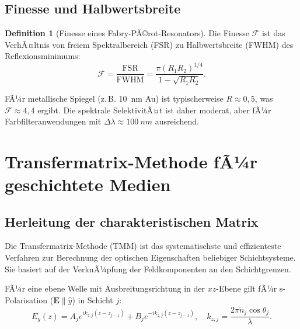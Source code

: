 ﻿\documentclass[a4paper,12pt]{article}
\theoremstyle{definition}
\newtheorem{definition}{Definition}[section]
\newcommand{\vect}[1]{\bm{#1}}
\begin{document}
	\subsection{Finesse und Halbwertsbreite}
	
	\begin{definition}[Finesse eines Fabry-PÃ©rot-Resonators]
		\label{def:finesse}
		Die Finesse $\mathcal{F}$ ist das VerhÃ¤ltnis von freiem Spektralbereich (FSR)
		zu Halbwertsbreite (FWHM) des Reflexionsminimums:
		\begin{equation}
			\mathcal{F} = \frac{\mathrm{FSR}}{\mathrm{FWHM}} = \frac{\pi (R_1 R_2)^{1/4}}{1 - \sqrt{R_1 R_2}}.
			\label{eq:finesse}
		\end{equation}
	\end{definition}
	
	FÃ¼r metallische Spiegel (z.\,B. \SI{10}{nm} Au) ist typischerweise
	$R \approx 0{,}5$, was $\mathcal{F} \approx 4{,}4$ ergibt.
	Die spektrale SelektivitÃ¤t ist daher moderat, aber fÃ¼r Farbfilteranwendungen
	mit $\Delta\lambda \approx \SI{100}{nm}$ ausreichend.
	
	\section{Transfermatrix-Methode fÃ¼r geschichtete Medien}
	\label{sec:tmm}
	
	\subsection{Herleitung der charakteristischen Matrix}
	
	Die Transfermatrix-Methode (TMM) ist das systematischste und effizienteste
	Verfahren zur Berechnung der optischen Eigenschaften beliebiger Schichtsysteme.
	Sie basiert auf der VerknÃ¼pfung der Feldkomponenten an den Schichtgrenzen.
	
	FÃ¼r eine ebene Welle mit Ausbreitungsrichtung in der $xz$-Ebene gilt
	fÃ¼r s-Polarisation ($\vect{E} \parallel \hat{y}$) in Schicht $j$:
	\begin{equation}
		E_y(z) = A_j e^{ik_{z,j}(z-z_{j-1})} + B_j e^{-ik_{z,j}(z-z_{j-1})},
		\quad k_{z,j} = \frac{2\pi \tilde{n}_j \cos\theta_j}{\lambda}.
		\label{eq:feldansatz}
	\end{equation}
	
\end{document}

